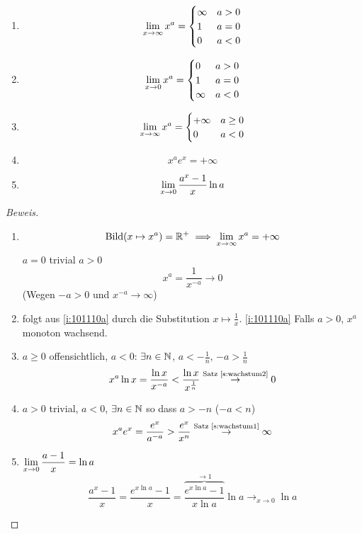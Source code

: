 \begin{Sat}
  \begin{enumerate}
    \item \[\displaystyle\lim_{x\rightarrow\infty}x^a= \begin{cases}
      \infty&a>0\\
      1&a=0\\
      0&a<0\\
    \end{cases}\] \label{i:101110a}
    \item \[\displaystyle\lim_{x\rightarrow0}x^a= \begin{cases}
      0&a>0\\
      1&a=0\\
      \infty&a<0\\
    \end{cases}\]  \label{i:101110b}
    \item \[\displaystyle\lim_{x\rightarrow\infty}x^a= \begin{cases}
      +\infty&a\geq0\\
      0&a<0\\
    \end{cases}\] \label{i:101110c}
    \item \[x^ae^x=+\infty\] \label{i:101110d}
    \item \[\displaystyle\lim_{x\rightarrow0}\frac{a^x-1}{x}\ln a\] \label{i:101110e}
  \end{enumerate}
\end{Sat}
\begin{proof}[Beweis]
  \begin{enumerate}
    \item 
      \[\text{Bild}(x\mapsto x^a)=\mathbb{R}^+\implies\displaystyle\lim_{x\rightarrow\infty}x^a=+\infty\]
      $a=0$ trivial
      $a>0$
      \[x^a=\frac{1}{x^{-a}}\to0\]
      (Wegen $-a>0$ und $x^{-a}\to\infty$)
    \item folgt aus \ref{i:101110a} durch die Substitution $x\mapsto \frac{1}{x}$. \ref{i:101110a} Falls $a>0$, $x^a$ monoton wachsend.
    \item $a\geq 0$ offensichtlich, $a<0$: $\exists n\in\mathbb{N}$, $a<-\frac{1}{n}$, $-a>\frac{1}{n}$
      \[x^a\ln x=\frac{\ln x}{x^{-a}}<\frac{\ln x}{x^{\frac{1}{n}}}\stackrel{\text{Satz \ref{s:wachstum2}}}{\to} 0\]
    \item $a>0$ trivial, $a<0$, $\exists n\in\mathbb{N}$ so dass $a>-n$ ($-a<n$)
      \[x^ae^x=\frac{e^x}{a^{-a}}>\frac{e^x}{x^n}\stackrel{\text{Satz \ref{s:wachstum1}}}{\to}\infty\]
    \item $\displaystyle\lim_{x\rightarrow0}\frac{a-1}{x}=\ln a$
      \[\frac{a^x-1}{x}=\frac{e^{x\ln a}-1}{x}=\overbrace{\frac{e^{x\ln a}-1}{x\ln a}}^{\to 1}\ln a\to_{x\to 0} \ln a\]
  \end{enumerate}
\end{proof}
